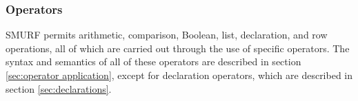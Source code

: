 \subsubsection{Operators}
SMURF permits arithmetic, comparison, Boolean, list, declaration, and row operations, all of which
are carried out through the use of specific operators. The syntax and semantics of all of these
operators are described in section \ref{sec:operator application}, except for declaration operators,
which are described in section \ref{sec:declarations}.


%
